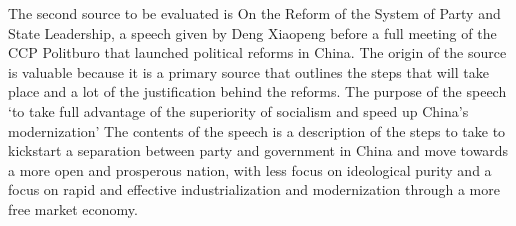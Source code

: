 \documentclass[../main.tex]{subfiles}
\begin{document}
The second source to be evaluated is On the Reform of the System of Party and State Leadership, a speech given by Deng Xiaopeng before a full meeting of the CCP Politburo that launched political reforms in China. The origin of the source is valuable because it is a primary source that outlines the steps that will take place and a lot of the justification behind the reforms. The purpose of the speech ‘to take full advantage of the superiority of socialism and speed up China's modernization’ The contents of the speech is a description of the steps to take to kickstart a separation between party and government in China and move towards a more open and prosperous nation, with less focus on ideological purity and a focus on rapid and effective industrialization and modernization through a more free market economy.
\end{document}
